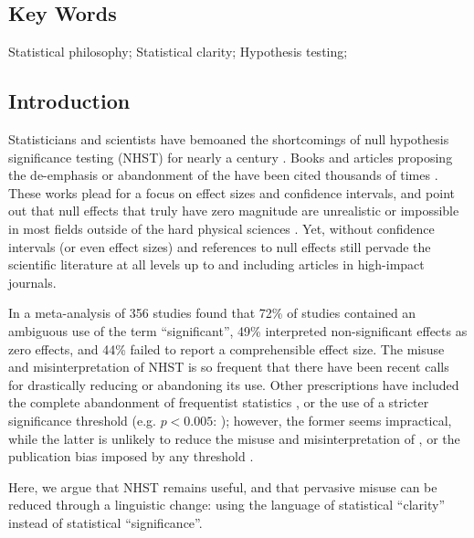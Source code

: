 \subsection*{Key Words}

\noindent Statistical philosophy; Statistical clarity; Hypothesis testing; \pval

\clearpage
\doublespacing

\subsection*{Introduction}

\noindent Statisticians and scientists have bemoaned the shortcomings of null hypothesis significance testing (NHST) for nearly a century \citep{Cohen1994}. Books and articles proposing the de-emphasis or abandonment of the \pval have been cited thousands of times \citep{Cohen1994, Goodman1999, Wilkinson1999, ZiliakandMcCloskey2008, WassersteinandLazar2016}. These works plead for a focus on effect sizes and confidence intervals, and point out that null effects that truly have zero magnitude are unrealistic or impossible in most fields outside of the hard physical sciences \citep{Meehl1990, Tukey1991, Cohen1994}. Yet, \pvals without confidence intervals (or even effect sizes) and references to null effects still pervade the scientific literature at all levels up to and including articles in high-impact journals.

In a meta-analysis of 356 studies \citet{Bernardietal.2017} found that 72\% of studies contained an ambiguous use of the term ``significant'', 49\% interpreted non-significant effects as zero effects, and 44\% failed to report a comprehensible effect size. The misuse and misinterpretation of NHST is so frequent that there have been recent calls for drastically reducing \citep{SzucsandIoannidis2017} or abandoning \citep{McShaneetal.2017} its use. Other prescriptions have included the complete abandonment of frequentist statistics \citep{The2011}, or the use of a stricter significance threshold (e.g. $p < 0.005$: \cite{Benjaminetal.2018}); however, the former seems impractical, while the latter is unlikely to reduce the misuse and misinterpretation of \pvals, or the publication bias imposed by any \pval threshold \citep{Ridleyetal.2007}.

Here, we argue that NHST remains useful, and that pervasive misuse can be reduced through a linguistic change: using the language of statistical ``clarity'' instead of statistical ``significance''.

